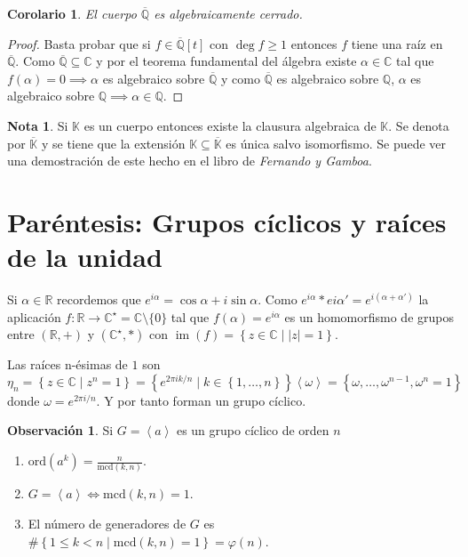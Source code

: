 \documentclass[10pt, spanish]{report}
\newtheorem*{cor}{Corolario}
\theoremstyle{definition}
\newtheorem*{obs}{Observación}
\newtheorem*{nota}{Nota}
\newcommand{\Q}{\mathbb{Q}}
\newcommand{\R}{\mathbb{R}}
\newcommand{\C}{\mathbb{C}}
\newcommand{\K}{\mathbb{K}}
\newcommand{\im}[1]{\operatorname{im}\left(#1\right)}
\renewcommand{\geq}{\geqslant}
\renewcommand{\leq}{\leqslant}
\begin{document}
\begin{cor}
    El cuerpo $\overline{\Q}$ es algebraicamente cerrado.
\end{cor}

\begin{proof}
    Basta probar que si $f\in\overline{\Q}[t]$ con $\deg{f}\geq1$ entonces $f$
    tiene una raíz en $\overline{\Q}$. Como $\overline{\Q}\subseteq\C$ y por el
    teorema fundamental del álgebra existe $\alpha\in\C$ tal que $f(\alpha)=0
    \implies\alpha$ es algebraico sobre $\overline{\Q}$ y como $\overline{\Q}$
    es algebraico sobre $\Q$, $\alpha$ es algebraico sobre $\Q \implies
    \alpha\in\Q$.
\end{proof}

\begin{nota}
    Si $\K$ es un cuerpo entonces existe la clausura algebraica de $\K$. Se
    denota por $\overline{\K}$ y se tiene que la extensión $\K\subseteq
    \overline{\K}$ es única salvo isomorfismo. Se puede ver una demostración de
    este hecho en el libro de \textit{Fernando y Gamboa}.
\end{nota}

\section{Paréntesis: Grupos cíclicos y raíces de la unidad}

Si $\alpha\in\R$ recordemos que $e^{i\alpha}=\cos{\alpha}+i\sin{\alpha}$. Como
$e^{i\alpha}*e{i\alpha'}=e^{i(\alpha+\alpha')}$ la aplicación
$f:\R\to\C^\star=\C\setminus\{0\}$ tal que $f(\alpha)=e^{i\alpha}$ es un
homomorfismo de grupos entre $(\R,+)$ y $(\C^\star,*)$ con $\im{f}=\left\{ z\in
\C\mid \left| z \right| = 1 \right\}$.

Las raíces n-ésimas de $1$ son \[\eta_n=\left\{ z\in \C\mid z^n=1 \right\} =
\left\{ e^{2\pi ik/n}\mid k\in\left\{1,\ldots,n\right\}\right\}\left< \omega
\right> = \left\{ \omega,\ldots,\omega^{n-1},\omega^n=1 \right\}\]
donde $\omega = e^{2\pi i /n}$. Y por tanto forman un grupo cíclico.

\begin{obs}
    Si $G= \left< a \right>$ es un grupo cíclico de orden $n$
    \begin{enumerate}
        \item $\text{ord}(a^k)=\frac{n}{\text{mcd}(k,n)}$.
        \item $G= \left< a \right> \Leftrightarrow \text{mcd}(k,n)=1$.
        \item El número de generadores de $G$ es $\#\left\{ 1\leq k<
            n\mid\text{mcd}(k,n)=1 \right\}=\varphi(n)$.
    \end{enumerate}
\end{obs}
\end{document}
